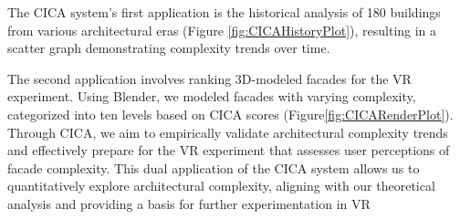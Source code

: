 The CICA system's first application is the historical analysis of 180 buildings from various architectural eras (Figure \ref{fig:CICAHistoryPlot}), resulting in a scatter graph demonstrating complexity trends over time.

The second application involves ranking 3D-modeled facades for the VR experiment.
Using Blender, we modeled facades with varying complexity, categorized into ten levels based on CICA scores (Figure\ref{fig:CICARenderPlot}).
Through CICA, we aim to empirically validate architectural complexity trends and effectively prepare for the VR experiment that assesses user perceptions of facade complexity.
This dual application of the CICA system allows us to quantitatively explore architectural complexity, aligning with our theoretical analysis and providing a basis for further experimentation in VR


